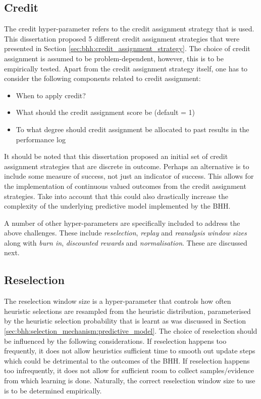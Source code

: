 \subsection{Credit}
\label{sec:bhh:hyper_parameters:credit}

The credit hyper-parameter refers to the credit assignment strategy that is used. This dissertation proposed 5 different credit assignment strategies that were presented in Section \ref{sec:bhh:credit_assignment_strategy}. The choice of credit assignment is assumed to be problem-dependent, however, this is to be empirically tested. Apart from the credit assignment strategy itself, one has to consider the following components related to credit assignment:

\begin{itemize}
    \item When to apply credit?
    \item What should the credit assignment score be (default = 1)
    \item To what degree should credit assignment be allocated to past results in the performance log
\end{itemize}

It should be noted that this dissertation proposed an initial set of credit assignment strategies that are discrete in outcome. Perhaps an alternative is to include some measure of success, not just an indicator of success. This allows for the implementation of continuous valued outcomes from the credit assignment strategies. Take into account that this could also drastically increase the complexity of the underlying predictive model implemented by the \ac{BHH}.

A number of other hyper-parameters are specifically included to address the above challenges. These include \textit{reselection}, \textit{replay} and \textit{reanalysis window sizes} along with \textit{burn in}, \textit{discounted rewards} and \textit{normalisation}. These are discussed next.

\subsection{Reselection}
\label{sec:bhh:hyper_parameters:reselection}

The reselection window size is a hyper-parameter that controls how often heuristic selections are resampled from the heuristic distribution, parameterised by the heuristic selection probability that is learnt as was discussed in Section \ref{sec:bhh:selection_mechanism:predictive_model}. The choice of reselection should be influenced by the following considerations. If reselection happens too frequently, it does not allow heuristics sufficient time to smooth out update steps which could be detrimental to the outcomes of the \ac{BHH}. If reselection happens too infrequently, it does not allow for sufficient room to collect samples/evidence from which learning is done. Naturally, the correct reselection window size to use is to be determined empirically.

